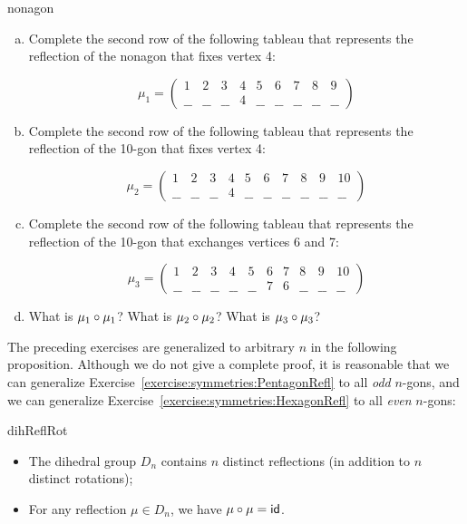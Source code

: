 \begin{exercise}{nonagon}
\begin{enumerate}[(a)]
\item 
Complete the second row of the following tableau that represents the reflection of the nonagon that fixes vertex 4:

$$\mu_1 = \begin{pmatrix} 1 & 2 & 3 & 4 & 5 & 6 & 7 & 8 & 9 \\ \_\_ & \_\_ & \_\_ & 4 & \_\_ & \_\_ & \_\_ & \_\_ & \_\_   \end{pmatrix}$$

\item
Complete the second row of the following tableau that represents the reflection of the 10-gon that fixes vertex 4:

$$\mu_2 = \begin{pmatrix} 1 & 2 & 3 & 4 & 5 & 6 & 7 & 8 & 9 & 10  \\ \_\_ & \_\_ & \_\_ & 4 & \_\_ & \_\_ & \_\_ & \_\_ & \_\_ & \_\_   \end{pmatrix}$$


\item 
Complete the second row of the following tableau that represents the reflection of the 10-gon that exchanges vertices 6 and 7:

$$\mu_3 = \begin{pmatrix} 1 & 2 & 3 & 4 & 5 & 6 & 7 & 8 & 9 & 10 \\ \_\_ & \_\_ & \_\_  & \_\_ & \_\_ & 7 & 6 & \_\_ & \_\_ & \_\_  \end{pmatrix}$$

\item
What is $\mu_1 \circ \mu_1$? What is $\mu_2 \circ \mu_2$? What is $\mu_3 \circ \mu_3$?
\end{enumerate}
\end{exercise}

The preceding exercises are generalized to arbitrary $n$ in the following proposition. Although we do not give a complete proof, it is reasonable that we can generalize Exercise~\ref{exercise:symmetries:PentagonRefl} to all \emph{odd} $n$-gons, and we can  generalize Exercise~\ref{exercise:symmetries:HexagonRefl} to all \emph{even} $n$-gons:

\begin{prop}{dihReflRot}
\begin{itemize}
\item
The dihedral group $D_n$ contains $n$ distinct reflections (in addition to $n$ distinct rotations);
\item
For any reflection $\mu \in D_n$, we have $\mu \circ \mu = {\sf{i}d}$.
\end{itemize}
\end{prop}

